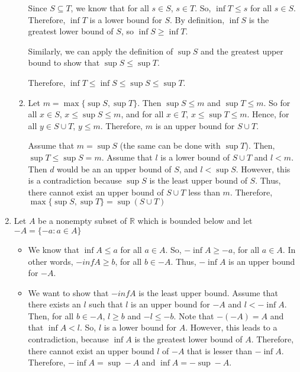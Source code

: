 \documentclass[12pt]{article}
\begin{document}
\begin{enumerate}[start=1,label={\bfseries Problem \arabic*:},leftmargin=1in]
\begin{enumerate}
        Since $S \subseteq T$, we know that for all $s \in S$, $s \in T$. 
        So, $\inf T \leq s$ for all $s \in S$. Therefore, $\inf T$ is a lower bound for $S$. By definition, $\inf S$ is the greatest lower bound of $S$, so $\inf S \geq \inf T$. 

        Similarly, we can apply the definition of $\sup S$ and the greatest upper bound to show that $\sup  S \leq \sup  T$. 

        Therefore, $\inf T \leq \inf S \leq \sup  S \leq \sup T$.


        \item Let $m = \max\{ \sup  S, \sup T \}$. Then $\sup  S \leq m$ and $\sup T \leq m$. 
        So for all $ x\in S$, $x \leq \sup S \leq m$, and for all $x \in T$, $x \leq \sup T \leq m$. 
        Hence, for all $y \in S \cup T$, $y \leq m$. Therefore, $m$ is an upper bound for $S \cup T$. 
        
        Assume that $m = \sup S$ (the same can be done with $\sup T$). Then, $\sup T \leq \sup S = m$. 
        Assume that $l$ is a lower bound of $S \cup T$ and $l < m$. Then $d$ would be an an upper bound of $S$, and $l < \sup S$. 
        However, this is a contradiction because $\sup  S$ is the least upper bound of $S$. Thus, there cannot exist an upper bound of $S \cup T$ less than $m$. 
        Therefore, $\max\{\sup S, \sup T\} = \sup(S \cup T)$ 

    \end{enumerate}

    \item Let $A$ be a nonempty subset of $\mathbb{R}$ which is bounded below and let $-A = \{ -a \colon a \in A\}$
    
    \begin{itemize}
        \item We know that $\inf A \leq a$ for all $a \in A$. So, $- \inf A \geq -a$, for all $a \in A$. 
        In other words, $-inf A \geq b$, for all $b \in -A$. Thus, $-\inf A$ is an upper bound for $-A$. 

        \item We want to show that $-inf A$ is the least upper bound.  Assume that there exists an $l$ such that $l$ is an upper bound for $-A$ and $l < -\inf A$. 
        Then, for all $b \in -A$, $l \geq b$ and $-l \leq -b$. Note that $-(-A) = A$ and that $\inf A < l$. So, $l$ is a lower bound for $A$. 
        However, this leads to a contradiction, because $\inf A$ is the greatest lower bound of $A$. Therefore, there cannot exist an upper bound $l$ of $-A$ that is lesser than $-\inf A$. 
        Therefore, $- \inf A = \sup -A$ and $\inf A = - \sup  -A$. 
    
    \end{itemize}
\end{enumerate}
\end{document}
